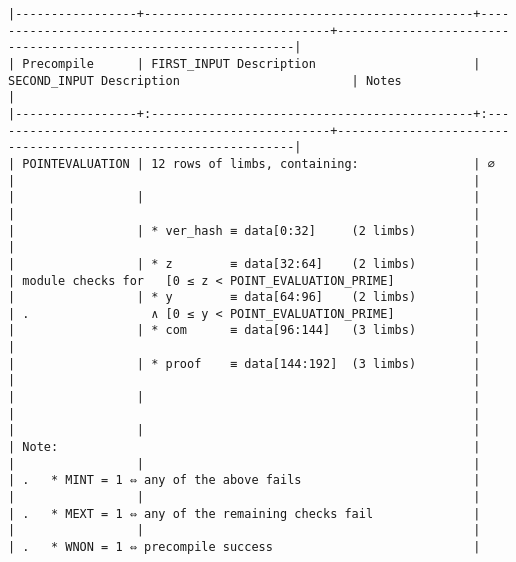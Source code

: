 \documentclass[varwidth=\maxdimen,margin=0.5cm,multi={verbatim}]{standalone}
\begin{document}
\begin{verbatim}
|-----------------+----------------------------------------------+-------------------------------------------------+----------------------------------------------------------------|
| Precompile      | FIRST_INPUT Description                      | SECOND_INPUT Description                        | Notes                                                          |
|-----------------+:---------------------------------------------+:------------------------------------------------+----------------------------------------------------------------|
| POINTEVALUATION | 12 rows of limbs, containing:                | ∅                                               |                                                                |
|                 |                                              |                                                 |                                                                |
|                 | * ver_hash ≡ data[0:32]     (2 limbs)        |                                                 |                                                                |
|                 | * z        ≡ data[32:64]    (2 limbs)        |                                                 | module checks for   [0 ≤ z < POINT_EVALUATION_PRIME]           |
|                 | * y        ≡ data[64:96]    (2 limbs)        |                                                 | .                 ∧ [0 ≤ y < POINT_EVALUATION_PRIME]           |
|                 | * com      ≡ data[96:144]   (3 limbs)        |                                                 |                                                                |
|                 | * proof    ≡ data[144:192]  (3 limbs)        |                                                 |                                                                |
|                 |                                              |                                                 |                                                                |
|                 |                                              |                                                 | Note:                                                          |
|                 |                                              |                                                 | .   * MINT = 1 ⇔ any of the above fails                        |
|                 |                                              |                                                 | .   * MEXT = 1 ⇔ any of the remaining checks fail              |
|                 |                                              |                                                 | .   * WNON = 1 ⇔ precompile success                            |

\end{verbatim}
\end{document}
